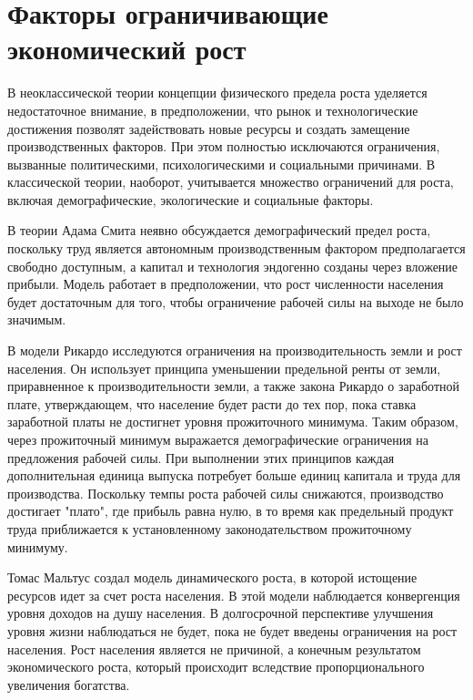 \documentclass[12pt,a4paper, oneside]{extreport}
\begin{document}
\section{Факторы ограничивающие экономический рост }


В неоклассической теории   концепции  физического  предела роста  уделяется недостаточное внимание, в предположении, что рынок и технологические достижения  позволят задействовать новые ресурсы и создать замещение производственных факторов. При этом   полностью исключаются  ограничения, вызванные  политическими, психологическими и социальными причинами. В классической теории, наоборот,  учитывается   множество ограничений для роста, включая демографические, экологические и социальные факторы.


В теории Адама  Смита  неявно обсуждается демографический предел роста, поскольку труд является автономным производственным фактором предполагается свободно доступным, а капитал и технология эндогенно созданы через вложение прибыли.
Модель работает в предположении, что рост численности населения  будет достаточным для того,  чтобы  ограничение рабочей силы на выходе не было значимым.


В модели Рикардо исследуются  ограничения   на производительность земли и рост населения.
Он использует  принципа уменьшении предельной ренты от  земли,  приравненное  к производительности земли, а также    закона Рикардо о заработной плате, утверждающем, что  население будет расти до тех пор, пока ставка  заработной платы не достигнет  уровня прожиточного минимума. Таким образом, через  прожиточный минимум выражается  демографические ограничения на предложения рабочей силы.  
При выполнении  этих принципов  каждая дополнительная единица  выпуска потребует больше единиц  капитала и труда для производства. Поскольку темпы роста рабочей силы снижаются,  производство достигает "плато", где прибыль равна  нулю, в то время как предельный продукт труда приближается к установленному законодательством прожиточному минимуму.


Томас Мальтус создал  модель  динамического роста, в которой  истощение  ресурсов идет за счет роста населения. 
В этой модели  наблюдается  конвергенция   уровня  доходов  на душу населения. 
В долгосрочной перспективе улучшения  уровня жизни наблюдаться не будет, пока  не будет введены  ограничения на рост населения.
Рост населения является не  причиной, а  конечным результатом  экономического роста, который происходит вследствие   пропорционального увеличения богатства.  
\end{document}
